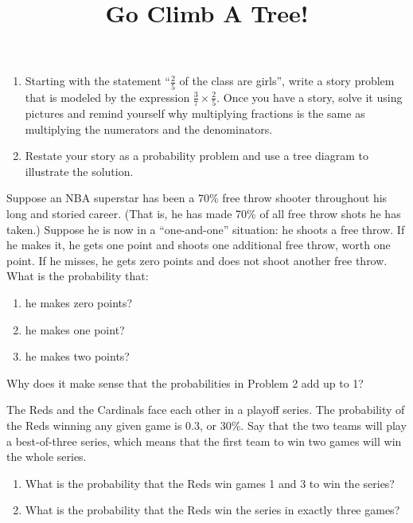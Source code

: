 \documentclass[nooutcomes,noauthor,handout]{ximera}
\title{Go Climb A Tree!}
\begin{document}
\begin{abstract}
\end{abstract}
\maketitle



\begin{problem}
\begin{enumerate}
\item Starting with the statement ``$\frac25$ of the class are girls'', write a story problem that is modeled by the expression $\frac37 \times \frac25$.  Once you have a story, solve it using pictures and remind yourself why multiplying fractions is the same as multiplying the numerators and the denominators.
\item Restate your story as a probability problem and use a tree diagram to illustrate the solution.
\end{enumerate}
\end{problem}

\begin{problem}\label{NBAStar}
Suppose an NBA superstar has been a 70\% free throw shooter throughout his long and storied career.  (That is, he has made 70\% of all free throw shots he has taken.)  Suppose he is now in a ``one-and-one'' situation: he shoots a free throw.  If he makes it, he gets one point and shoots one additional free throw, worth one point.  If he misses, he gets zero points and does not shoot another free throw.  What is the probability that:
\begin{enumerate}
\item he makes zero points?
\item he makes one point?
\item he makes two points?
\end{enumerate}
\end{problem}

\begin{problem}
Why does it make sense that the probabilities in Problem 2 add up to 1?
\end{problem}

\begin{problem}
The Reds and the Cardinals face each other in a playoff series.  The probability of the Reds winning any given game is 0.3, or 30\%.  Say that the two teams will play a best-of-three series, which means that the first team to win two games will win the whole series.

\begin{enumerate}
\item What is the probability that the Reds win games 1 and 3 to win the series?
\item What is the probability that the Reds win the series in exactly three games?
\end{enumerate}
\end{problem}
\end{document}

